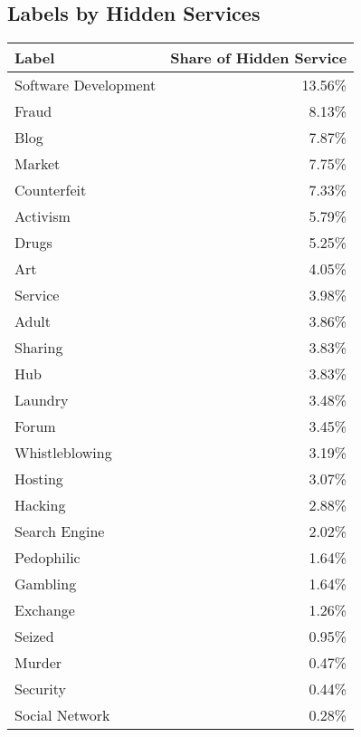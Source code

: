 \subsection{Labels by Hidden Services}
\label{appendix:labelsByHosts}
\begin{center}
    \begin{supertabular}[H]{l|r}
    \textbf{Label}  & \textbf{Share of Hidden Service}\\
    \hline
    \hline
    Software Development	&	13.56\%\\
	\hline
	Fraud		&	8.13\%\\
	\hline
	Blog		&	7.87\%\\
	\hline
	Market		&	7.75\%\\
	\hline
	Counterfeit	&	7.33\%\\
	\hline
	Activism	&	5.79\%\\
	\hline
	Drugs		&	5.25\%\\
	\hline
	Art			&	4.05\%\\
	\hline
	Service		&	3.98\%\\
	\hline
	Adult		&	3.86\%\\
	\hline
	Sharing		&	3.83\%\\
	\hline
	Hub		&	3.83\%\\
	\hline
	Laundry		&	3.48\%\\
	\hline
	Forum		&	3.45\%\\
	\hline
	Whistleblowing			&	3.19\%\\
	\hline
	Hosting		&	3.07\%\\
	\hline
	Hacking		&	2.88\%\\
	\hline
	Search Engine			&	2.02\%\\
	\hline
	Pedophilic	&	1.64\%\\
	\hline
	Gambling	&	1.64\%\\
	\hline
	Exchange	&	1.26\%\\
	\hline
	Seized		&	0.95\%\\
	\hline
	Murder		&	0.47\%\\
	\hline
	Security	&	0.44\%\\
	\hline
	Social Network			&	0.28\%\\
    \end{supertabular}
\end{center}
